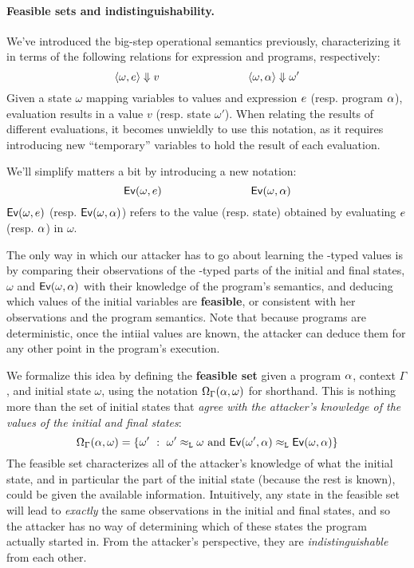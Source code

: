 \documentclass[11pt,twoside]{scrartcl}
\begin{document}
\paragraph{Feasible sets and indistinguishability.} We've introduced the big-step operational semantics previously, characterizing it in terms of the following relations for expression and programs, respectively:
\[
\langle \omega, e\rangle \Downarrow v
\quad\quad\quad\quad\quad\quad\quad\quad
\langle \omega, \alpha\rangle \Downarrow \omega'
\]
Given a state $\omega$ mapping variables to values and expression $e$ (resp. program $\alpha$), evaluation results in a value $v$ (resp. state $\omega'$). When relating the results of different evaluations, it becomes unwieldly to use this notation, as it requires introducing new ``temporary'' variables to hold the result of each evaluation.

We'll simplify matters a bit by introducing a new notation:
\[
\mathsf{Ev}(\omega,e)
\quad\quad\quad\quad\quad\quad\quad\quad
\mathsf{Ev}(\omega,\alpha)
\]
$\mathsf{Ev}(\omega,e)$ (resp. $\mathsf{Ev}(\omega,\alpha)$) refers to the value (resp. state) obtained by evaluating $e$ (resp. $\alpha$) in $\omega$.

The only way in which our attacker has to go about learning the \hisec-typed values is by comparing their observations of the \lowsec-typed parts of the initial and final states, $\omega$ and $\mathsf{Ev}(\omega,\alpha)$ with their knowledge of the program's semantics, and deducing which values of the initial \hisec variables are \textbf{feasible}, or consistent with her observations and the program semantics. Note that because programs are deterministic, once the intiial \hisec values are known, the attacker can deduce them for any other point in the program's execution.

We formalize this idea by defining the \textbf{feasible set} given a program $\alpha$, context $\Gamma$, and initial state $\omega$, using the notation $\Omega_{\Gamma}(\alpha,\omega)$ for shorthand. This is nothing more than the set of initial states that \emph{agree with the attacker's knowledge of the \lowsec values of the initial and final states}:
\[
\Omega_\Gamma(\alpha,\omega) =
\{
 \omega' ~\mathrel{\mathop{:}}~ \omega' \approx_{\texttt{\upshape L}} \omega~\text{and}~\mathsf{Ev}(\omega',\alpha) \approx_{\texttt{\upshape L}} \mathsf{Ev}(\omega,\alpha)
\}
\]
The feasible set characterizes all of the attacker's knowledge of what the initial state, and in particular the \hisec part of the initial state (because the rest is known), could be given the available information. Intuitively, any state in the feasible set will lead to \emph{exactly} the same observations in the initial and final states, and so the attacker has no way of determining which of these states the program actually started in. From the attacker's perspective, they are \emph{indistinguishable} from each other.
\end{document}
